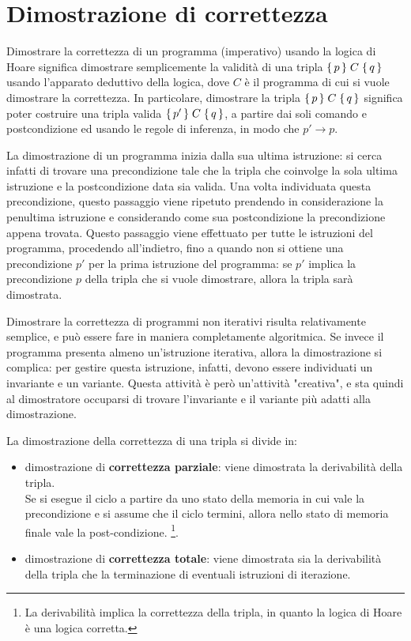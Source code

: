 \section{Dimostrazione di correttezza}
Dimostrare la correttezza di un programma (imperativo) usando la logica di
Hoare significa dimostrare semplicemente la validità di una tripla
$\Hoaretriple{p}{C}{q}$ usando l'apparato deduttivo della logica, dove
$C$ è il programma di cui si vuole dimostrare la correttezza.
In particolare, dimostrare la tripla $\Hoaretriple{p}{C}{q}$ significa
poter costruire una tripla valida $\Hoaretriple{p'}{C}{q}$, a partire dai soli comando e postcondizione ed usando
le regole di inferenza, in modo che $p' \rightarrow p$.

La dimostrazione di un programma inizia dalla sua ultima istruzione:
si cerca infatti di trovare una precondizione tale che la tripla
che coinvolge la sola ultima istruzione e la postcondizione data sia valida.
Una volta individuata questa precondizione, questo passaggio viene ripetuto
prendendo in considerazione la penultima istruzione e considerando come
sua postcondizione la precondizione appena trovata.
Questo passaggio viene effettuato per tutte le istruzioni del programma,
procedendo all'indietro, fino a quando non si ottiene una precondizione $p'$
per la prima istruzione del programma: se $p'$ implica la precondizione $p$
della tripla che si vuole dimostrare, allora la tripla sarà dimostrata.

Dimostrare la correttezza di programmi non iterativi risulta relativamente
semplice, e può essere fare in maniera completamente algoritmica.
Se invece il programma presenta almeno un'istruzione iterativa, allora
la dimostrazione si complica: per gestire questa istruzione, infatti,
devono essere individuati un invariante e un variante. Questa attività
è però un'attività "creativa", e sta quindi al dimostratore occuparsi di
trovare l'invariante e il variante più adatti alla dimostrazione.

La dimostrazione della correttezza di una tripla si divide in:
\begin{itemize}
    \item dimostrazione di \textbf{correttezza parziale}: viene dimostrata
    la derivabilità della tripla.\\
    Se si esegue il ciclo a partire da uno stato della memoria in cui vale
    la precondizione e si assume che il ciclo termini,
    allora nello stato di memoria finale vale la post-condizione.
    \footnote{La derivabilità implica la correttezza della tripla, in quanto
    la logica di Hoare è una logica corretta.}.
    \item dimostrazione di \textbf{correttezza totale}: viene dimostrata sia
    la derivabilità della tripla che la terminazione di eventuali istruzioni
    di iterazione.
\end{itemize}

